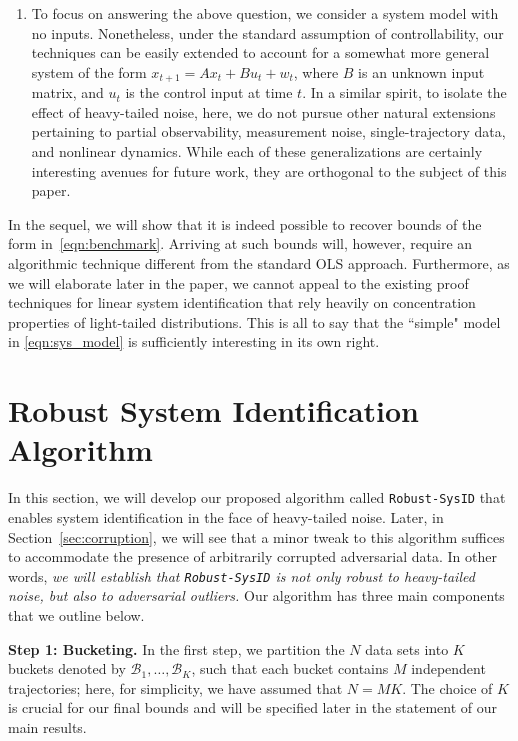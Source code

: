 \documentclass[letterpaper, 11 pt]{article}
\newcommand{\mc}{\mathcal}
\begin{document}
\begin{enumerate}
\item[3.] To focus on answering the above question, we consider a system model with no inputs. Nonetheless, under the standard assumption of controllability, our techniques can be easily extended to account for a somewhat more general system of the form $x_{t+1}= A x_t + B u_t + w_t$, where $B$ is an unknown input matrix, and $u_t$ is the control input at time $t$. In a similar spirit, to isolate the effect of heavy-tailed noise, here, we do not pursue other natural extensions pertaining to partial observability, measurement noise, single-trajectory data, and nonlinear dynamics. While each of these generalizations are certainly interesting avenues for future work, they are orthogonal to the subject of this paper. 
\end{enumerate}

In the sequel, we will show that it is indeed possible to recover bounds of the form in~\eqref{eqn:benchmark}. Arriving at such bounds will, however, require an algorithmic technique different from the standard OLS approach. Furthermore, as we will elaborate later in the paper, we cannot appeal to the existing proof techniques for linear system identification that rely heavily on concentration properties of light-tailed distributions. This is all to say that the ``simple" model in \eqref{eqn:sys_model} is sufficiently interesting in its own right. 

\section{Robust System Identification Algorithm}
\label{sec:Algo}
In this section, we will develop our proposed algorithm called \texttt{Robust-SysID} that enables system identification in the face of heavy-tailed noise. Later, in Section~\ref{sec:corruption}, we will see that a minor tweak to this algorithm suffices to accommodate the presence of arbitrarily corrupted adversarial data. In other words, \emph{we will establish that \texttt{Robust-SysID} is not only robust to heavy-tailed noise, but also to adversarial outliers.} Our algorithm has three main components that we outline below. 

\textbf{Step 1: Bucketing.} In the first step, we partition the $N$ data sets into $K$ buckets denoted by $\mc{B}_1, \ldots, \mc{B}_K$, such that each bucket contains $M$ independent trajectories; here, for simplicity, we have assumed that $N=MK$. The choice of $K$ is crucial for our final bounds and will be specified later in the statement of our main results. 
\end{document}
